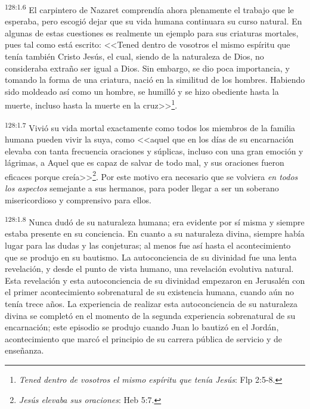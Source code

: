 \par 
\textsuperscript{128:1.6} El carpintero de Nazaret comprendía ahora plenamente el trabajo que le esperaba, pero escogió dejar que su vida humana continuara su curso natural. En algunas de estas cuestiones es realmente un ejemplo para sus criaturas mortales, pues tal como está escrito: <<Tened dentro de vosotros el mismo espíritu que tenía también Cristo Jesús, el cual, siendo de la naturaleza de Dios, no consideraba extraño ser igual a Dios. Sin embargo, se dio poca importancia, y tomando la forma de una criatura, nació en la similitud de los hombres. Habiendo sido moldeado así como un hombre, se humilló y se hizo obediente hasta la muerte, incluso hasta la muerte en la cruz>>\footnote{\textit{Tened dentro de vosotros el mismo espíritu que tenía Jesús}: Flp 2:5-8.}.

\par 
\textsuperscript{128:1.7} Vivió su vida mortal exactamente como todos los miembros de la familia humana pueden vivir la suya, como <<aquel que en los días de su encarnación elevaba con tanta frecuencia oraciones y súplicas, incluso con una gran emoción y lágrimas, a Aquel que es capaz de salvar de todo mal, y sus oraciones fueron eficaces porque creía>>\footnote{\textit{Jesús elevaba sus oraciones}: Heb 5:7.}. Por este motivo era necesario que se volviera \textit{en todos los aspectos} semejante a sus hermanos, para poder llegar a ser un soberano misericordioso y comprensivo para ellos.

\par 
\textsuperscript{128:1.8} Nunca dudó de su naturaleza humana; era evidente por sí misma y siempre estaba presente en su conciencia. En cuanto a su naturaleza divina, siempre había lugar para las dudas y las conjeturas; al menos fue así hasta el acontecimiento que se produjo en su bautismo. La autoconciencia de su divinidad fue una lenta revelación, y desde el punto de vista humano, una revelación evolutiva natural. Esta revelación y esta autoconciencia de su divinidad empezaron en Jerusalén con el primer acontecimiento sobrenatural de su existencia humana, cuando aún no tenía trece años. La experiencia de realizar esta autoconciencia de su naturaleza divina se completó en el momento de la segunda experiencia sobrenatural de su encarnación; este episodio se produjo cuando Juan lo bautizó en el Jordán, acontecimiento que marcó el principio de su carrera pública de servicio y de enseñanza.

